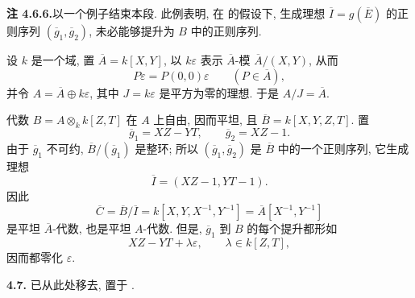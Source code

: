 \medskip
\noindent{}\textbf{注 4.6.6.}\footnotemark[88]
以一个例子结束本段. 此例表明, 在
的假设下, 生成理想 \(\overline I=g(\overline E)\) 的正则序列
\((\overline g_1,\overline g_2)\), 未必能够提升为 \(B\) 中的正则序列.

设 \(k\) 是一个域, 置 \(\overline A=k[X,Y]\),
以 \(k\varepsilon\) 表示 \(\overline A\)-模
\(\overline A/(X,Y)\), 从而
\[
 P\varepsilon=P(0,0)\varepsilon
 \qquad(P\in\overline A),
\]
并令 \(A=\overline A\oplus k\varepsilon\),
其中 \(J=k\varepsilon\) 是平方为零的理想.
于是 \(A/J=\overline A\).

代数 \(B=A\otimes_k k[Z,T]\) 在 \(A\) 上自由, 因而平坦,
且 \(\overline B=k[X,Y,Z,T]\). 置
\[
 \overline g_1=XZ-YT,
 \qquad
 \overline g_2=XZ-1.
\]
由于 \(\overline g_1\) 不可约,
\(\overline B/(\overline g_1)\) 是整环;
所以 \((\overline g_1,\overline g_2)\) 是 \(\overline B\) 中的一个正则序列,
它生成理想
\[
 \overline I=(XZ-1,YT-1).
\]
因此
\[
 \overline C=\overline B/\overline I
 =k[X,Y,X^{-1},Y^{-1}]
 =\overline A[X^{-1},Y^{-1}]
\]
是平坦 \(\overline A\)-代数, 也是平坦 \(A\)-代数.
但是, \(\overline g_1\) 到 \(B\) 的每个提升都形如
\[
 XZ-YT+\lambda\varepsilon,
 \qquad \lambda\in k[Z,T],
\]
因而都零化 \(\varepsilon\).

\smallskip
{}

\medskip
\noindent{}\textbf{4.7.}
 已从此处移去,
置于 .


